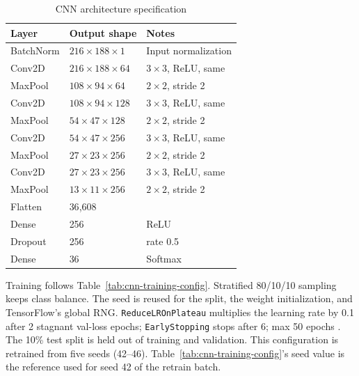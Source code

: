 \documentclass[pdflatex,sn-mathphys-num,iicol]{sn-jnl}
\theoremstyle{thmstyleone}
\theoremstyle{thmstyletwo}
\theoremstyle{thmstylethree}
\begin{document}
\begin{table}[t]
\caption{CNN architecture specification}\label{tab:cnn-architecture}
\begin{tabularx}{\columnwidth}{@{}lXl@{}}
\toprule
Layer & Output shape & Notes \\
\midrule
BatchNorm & $216{\times}188{\times}1$ & Input normalization \\
Conv2D & $216{\times}188{\times}64$ & $3{\times}3$, ReLU, same \\
MaxPool & $108{\times}94{\times}64$ & $2{\times}2$, stride 2 \\
Conv2D & $108{\times}94{\times}128$ & $3{\times}3$, ReLU, same \\
MaxPool & $54{\times}47{\times}128$ & $2{\times}2$, stride 2 \\
Conv2D & $54{\times}47{\times}256$ & $3{\times}3$, ReLU, same \\
MaxPool & $27{\times}23{\times}256$ & $2{\times}2$, stride 2 \\
Conv2D & $27{\times}23{\times}256$ & $3{\times}3$, ReLU, same \\
MaxPool & $13{\times}11{\times}256$ & $2{\times}2$, stride 2 \\
Flatten & 36{,}608 & \\
Dense & 256 & ReLU \\
Dropout & 256 & rate 0.5 \\
Dense & 36 & Softmax \\
\bottomrule
\end{tabularx}
\end{table}

Training follows Table~\ref{tab:cnn-training-config}. Stratified 80/10/10 sampling keeps class balance. The seed is reused for the split, the weight initialization, and TensorFlow's global RNG. \texttt{ReduceLROnPlateau} multiplies the learning rate by 0.1 after 2 stagnant val-loss epochs; \texttt{EarlyStopping} stops after 6; max 50 epochs \cite{Wolf-Monheim2025}. The 10\% test split is held out of training and validation. This configuration is retrained from five seeds (42--46). Table~\ref{tab:cnn-training-config}'s seed value is the reference used for seed 42 of the retrain batch.
\end{document}
